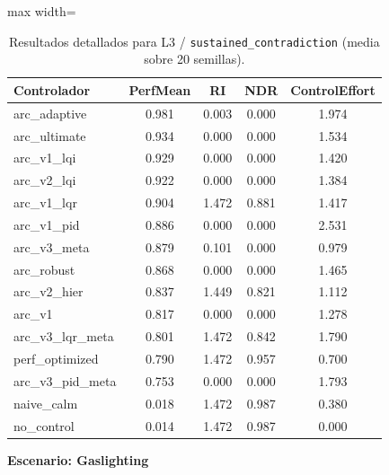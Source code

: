 \documentclass{article}
\newcommand{\scenarioheader}[1]{\Needspace{20\baselineskip}\textbf{Escenario: #1}}
\begin{document}
\begin{table}[H]
\centering
\footnotesize
\caption{Resultados detallados para L3 / \texttt{sustained\_contradiction} (media sobre 20 semillas).}
\label{tab:g6_sustained_contradiction}
\begin{adjustbox}{max width=\textwidth}
\begin{tabular}{@{}lcccc@{}}
\toprule
Controlador & PerfMean & RI & NDR & ControlEffort \\ \midrule
arc\_adaptive & 0.981 & 0.003 & 0.000 & 1.974 \\
arc\_ultimate & 0.934 & 0.000 & 0.000 & 1.534 \\
arc\_v1\_lqi & 0.929 & 0.000 & 0.000 & 1.420 \\
arc\_v2\_lqi & 0.922 & 0.000 & 0.000 & 1.384 \\
arc\_v1\_lqr & 0.904 & 1.472 & 0.881 & 1.417 \\
arc\_v1\_pid & 0.886 & 0.000 & 0.000 & 2.531 \\
arc\_v3\_meta & 0.879 & 0.101 & 0.000 & 0.979 \\
arc\_robust & 0.868 & 0.000 & 0.000 & 1.465 \\
arc\_v2\_hier & 0.837 & 1.449 & 0.821 & 1.112 \\
arc\_v1 & 0.817 & 0.000 & 0.000 & 1.278 \\
arc\_v3\_lqr\_meta & 0.801 & 1.472 & 0.842 & 1.790 \\
perf\_optimized & 0.790 & 1.472 & 0.957 & 0.700 \\
arc\_v3\_pid\_meta & 0.753 & 0.000 & 0.000 & 1.793 \\
naive\_calm & 0.018 & 1.472 & 0.987 & 0.380 \\
no\_control & 0.014 & 1.472 & 0.987 & 0.000 \\ \bottomrule
\end{tabular}
\end{adjustbox}
\end{table}

\scenarioheader{Gaslighting}
\end{document}
